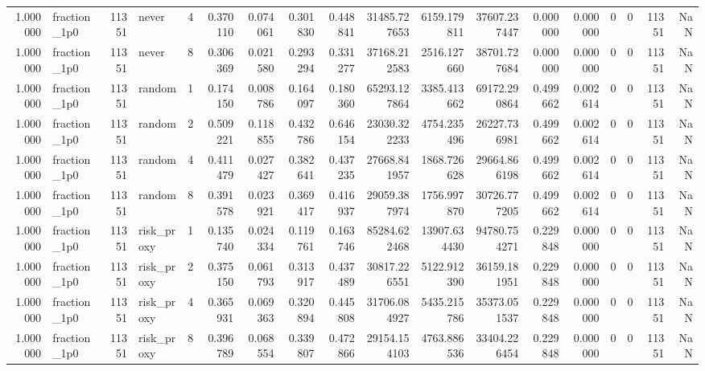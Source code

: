 \begin{tabular}{rlrlrrrrrrrrrrrrrr}
1.000000 & fraction\_1p0 & 11351 & never & 4 & 0.370110 & 0.074061 & 0.301830 & 0.448841 & 31485.727653 & 6159.179811 & 37607.237447 & 0.000000 & 0.000000 & 0 & 0 & 11351 & NaN \\
1.000000 & fraction\_1p0 & 11351 & never & 8 & 0.306369 & 0.021580 & 0.293294 & 0.331277 & 37168.212583 & 2516.127660 & 38701.727684 & 0.000000 & 0.000000 & 0 & 0 & 11351 & NaN \\
1.000000 & fraction\_1p0 & 11351 & random & 1 & 0.174150 & 0.008786 & 0.164097 & 0.180360 & 65293.127864 & 3385.413662 & 69172.290864 & 0.499662 & 0.002614 & 0 & 0 & 11351 & NaN \\
1.000000 & fraction\_1p0 & 11351 & random & 2 & 0.509221 & 0.118855 & 0.432786 & 0.646154 & 23030.322233 & 4754.235496 & 26227.736981 & 0.499662 & 0.002614 & 0 & 0 & 11351 & NaN \\
1.000000 & fraction\_1p0 & 11351 & random & 4 & 0.411479 & 0.027427 & 0.382641 & 0.437235 & 27668.841957 & 1868.726628 & 29664.866198 & 0.499662 & 0.002614 & 0 & 0 & 11351 & NaN \\
1.000000 & fraction\_1p0 & 11351 & random & 8 & 0.391578 & 0.023921 & 0.369417 & 0.416937 & 29059.387974 & 1756.997870 & 30726.777205 & 0.499662 & 0.002614 & 0 & 0 & 11351 & NaN \\
1.000000 & fraction\_1p0 & 11351 & risk\_proxy & 1 & 0.135740 & 0.024334 & 0.119761 & 0.163746 & 85284.622468 & 13907.634430 & 94780.754271 & 0.229848 & 0.000000 & 0 & 0 & 11351 & NaN \\
1.000000 & fraction\_1p0 & 11351 & risk\_proxy & 2 & 0.375150 & 0.061793 & 0.313917 & 0.437489 & 30817.226551 & 5122.912390 & 36159.181951 & 0.229848 & 0.000000 & 0 & 0 & 11351 & NaN \\
1.000000 & fraction\_1p0 & 11351 & risk\_proxy & 4 & 0.365931 & 0.069363 & 0.320894 & 0.445808 & 31706.084927 & 5435.215786 & 35373.051537 & 0.229848 & 0.000000 & 0 & 0 & 11351 & NaN \\
1.000000 & fraction\_1p0 & 11351 & risk\_proxy & 8 & 0.396789 & 0.068554 & 0.339807 & 0.472866 & 29154.154103 & 4763.886536 & 33404.226454 & 0.229848 & 0.000000 & 0 & 0 & 11351 & NaN \\
\bottomrule
\end{tabular}
